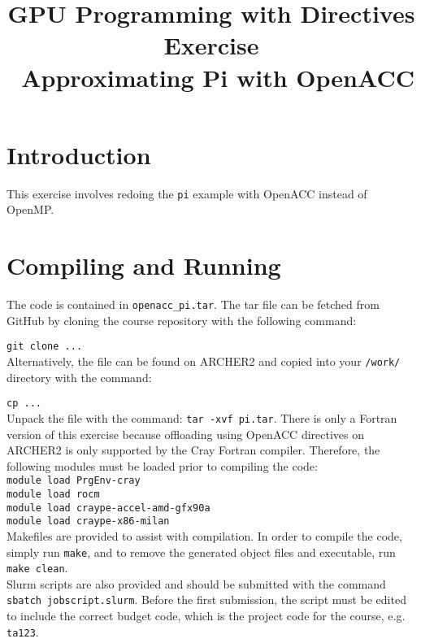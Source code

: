 \documentclass{article}
\title{GPU Programming with Directives Exercise \\\ Approximating Pi with OpenACC}
\author{}
\date{}
\begin{document}
\maketitle

\section{Introduction}

This exercise involves redoing the \texttt{pi} example with OpenACC instead of OpenMP. 


\section{Compiling and Running}

The code is contained in \texttt{openacc\_pi.tar}. The tar file can be fetched from GitHub by cloning the course repository with the following command:

\texttt{git clone ...} \\

\noindent Alternatively, the file can be found on ARCHER2 and copied into your \texttt{/work/} directory with the command:

\texttt{cp ...} \\

\noindent Unpack the file with the command: \texttt{tar -xvf pi.tar}. There is only a Fortran version of this exercise because offloading using OpenACC directives on ARCHER2 is only supported by the Cray Fortran compiler. Therefore, the following modules must be loaded prior to compiling the code: \\

\texttt{module load PrgEnv-cray} \\
\indent \texttt{module load rocm} \\
\indent \texttt{module load craype-accel-amd-gfx90a} \\
\indent \texttt{module load craype-x86-milan} \\  

\noindent Makefiles are provided to assist with compilation. In order to compile the code, simply run \texttt{make}, and to remove the generated object files and executable, run \texttt{make clean}. \\

\noindent Slurm scripts are also provided and should be submitted with the command \texttt{sbatch jobscript.slurm}. Before the first submission, the script must be edited to include the correct budget code, which is the project code for the course, e.g. \texttt{ta123}. 
\end{document}

